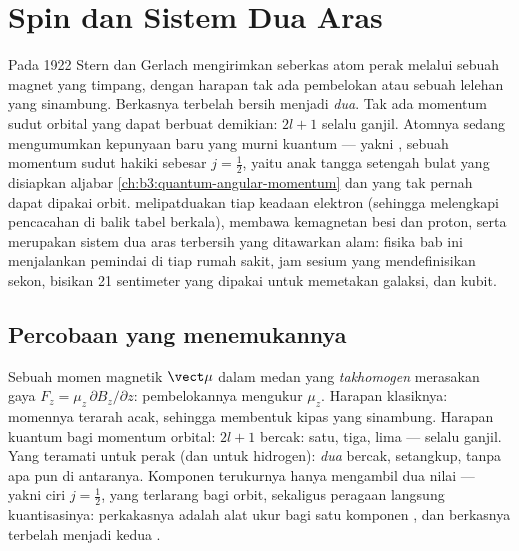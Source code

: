 \chapter{Spin dan Sistem Dua Aras}\label{ch:b3:spin-two-level}

Pada 1922 Stern dan Gerlach mengirimkan seberkas atom perak melalui
sebuah magnet yang timpang, dengan harapan tak ada pembelokan atau
sebuah lelehan yang sinambung. Berkasnya terbelah bersih menjadi
\emph{dua}. Tak ada momentum sudut orbital yang dapat berbuat demikian:
$2l + 1$ selalu ganjil. Atomnya sedang mengumumkan kepunyaan baru yang
murni kuantum --- yakni \emph{}, sebuah momentum sudut hakiki
sebesar $j = \tfrac12$, yaitu anak tangga setengah bulat yang disiapkan
aljabar \cref{ch:b3:quantum-angular-momentum} dan yang tak pernah dapat
dipakai orbit.  melipatduakan tiap keadaan elektron (sehingga
melengkapi pencacahan di balik tabel berkala), membawa kemagnetan besi
dan proton, serta merupakan sistem dua aras terbersih yang ditawarkan
alam: fisika bab ini menjalankan pemindai  di tiap
rumah sakit, jam sesium yang mendefinisikan sekon, bisikan 21 sentimeter
yang dipakai untuk memetakan galaksi, dan kubit.

\section{Percobaan yang menemukannya}

\begin{example}\label{ex:b3:spin-two-level:stern-gerlach}
Sebuah momen magnetik $\vect\mu$ dalam medan yang \emph{takhomogen}
merasakan gaya $F_z = \mu_z\,\partial B_z/\partial z$: pembelokannya
mengukur $\mu_z$. Harapan klasiknya: momennya terarah acak, sehingga
membentuk kipas yang sinambung. Harapan kuantum bagi momentum orbital:
$2l + 1$ bercak: satu, tiga, lima --- selalu ganjil. Yang teramati untuk
perak (dan untuk hidrogen): \emph{dua} bercak, setangkup, tanpa apa pun
di antaranya. Komponen terukurnya hanya mengambil dua nilai --- yakni ciri $j
= \tfrac12$, yang terlarang bagi orbit, sekaligus peragaan
langsung kuantisasinya: perkakasnya adalah alat ukur bagi satu komponen
, dan berkasnya terbelah menjadi kedua .
\end{example}

